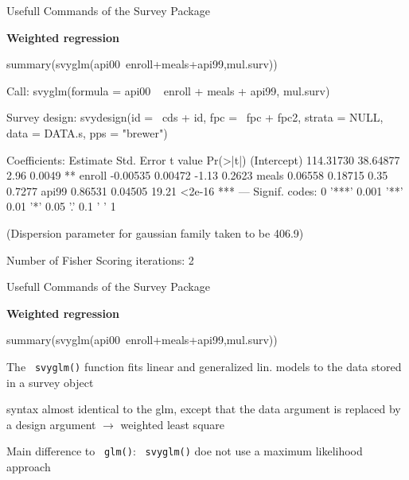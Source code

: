 \documentclass[11pt,german,hideothersubsections]{beamer}
\newcommand{\R}[1]{{\tt \color{blue}  #1}}
\begin{document}
\begin{frame}[fragile]{Usefull Commands} {of the Survey Package}
\footnotesize{
\begin{center}
\textbf{Weighted regression}
\end{center}
\scriptsize{
\begin{Schunk}
\begin{Sinput}
 summary(svyglm(api00~enroll+meals+api99,mul.surv))
\end{Sinput}
\begin{Soutput}
Call:
svyglm(formula = api00 ~ enroll + meals + api99, mul.surv)

Survey design:
svydesign(id = ~cds + id, fpc = ~fpc + fpc2, strata = NULL, data = DATA.s, 
    pps = "brewer")

Coefficients:
             Estimate Std. Error t value Pr(>|t|)    
(Intercept) 114.31730   38.64877    2.96   0.0049 ** 
enroll       -0.00535    0.00472   -1.13   0.2623    
meals         0.06558    0.18715    0.35   0.7277    
api99         0.86531    0.04505   19.21   <2e-16 ***
---
Signif. codes:  0 '***' 0.001 '**' 0.01 '*' 0.05 '.' 0.1 ' ' 1

(Dispersion parameter for gaussian family taken to be 406.9)

Number of Fisher Scoring iterations: 2
\end{Soutput}
\end{Schunk}
}
}
\end{frame}

\begin{frame}[fragile]{Usefull Commands} {of the Survey Package}
\footnotesize{
\begin{center}
\textbf{Weighted regression}
\end{center}

\begin{Schunk}
\begin{Sinput}
 summary(svyglm(api00~enroll+meals+api99,mul.surv))
\end{Sinput}
\end{Schunk}

\begin{itemize}\footnotesize{
\item The \R{svyglm()} function fits linear and generalized lin. models to the data stored in a survey object 
\item syntax almost identical to the glm, except that the data argument is replaced by a design argument $\rightarrow$ weighted least square
\item Main difference to \R{glm()}: \R{svyglm()} doe not use a maximum likelihood approach}
\end{itemize}
}
\end{frame}
\end{document}
